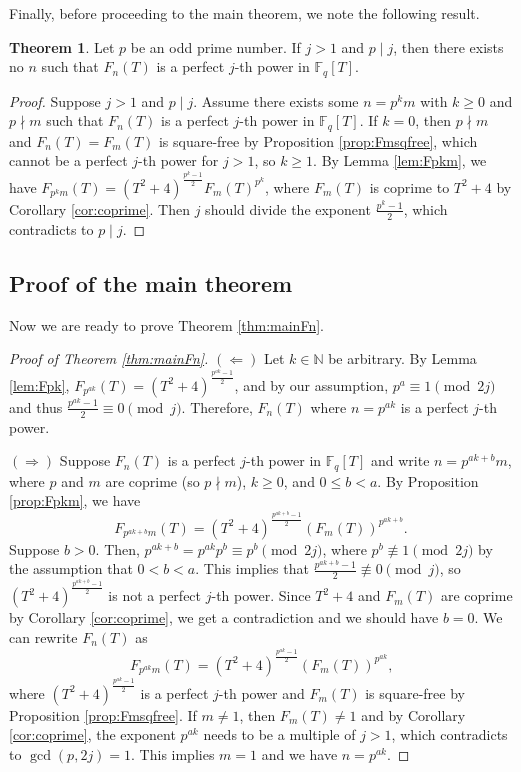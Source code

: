 \documentclass[letterpaper, 10pt]{article}
\newcommand{\1}{\mathds{1}}	%
\theoremstyle{definition}
\newtheorem{theorem}{Theorem}[section]
\theoremstyle{remark}
\begin{document}
Finally, before proceeding to the main theorem, we note the following result.

\begin{theorem}
    \label{thm:Fnnonpower}
    Let $p$ be an odd prime number. If $j > 1$ and $p \mid j$, then there exists no $n$ such that $F_n(T)$ is a perfect $j$-th power in $\mathbb{F}_q[T]$.
\end{theorem}

\begin{proof}
    Suppose $j > 1$ and $p \mid j$. Assume there exists some $n = p^km$ with $k \geq 0$ and $p \nmid m$ such that $F_n(T)$ is a perfect $j$-th power in $\mathbb{F}_q[T]$. 
    If $k = 0$, then $p \nmid m$ and $F_n(T) = F_m(T)$ is square-free by Proposition \ref{prop:Fmsqfree}, which cannot be a perfect $j$-th power for $j > 1$, so $k \ge 1$.
    By Lemma \ref{lem:Fpkm}, we have $F_{p^k m}(T) = (T^2 + 4)^{\frac{p^k - 1}{2}} F_m(T)^{p^k}$, where $F_m(T)$ is coprime to $T^2 + 4$ by Corollary \ref{cor:coprime}.
    Then $j$ should divide the exponent $\frac{p^k - 1}{2}$, which contradicts to $p \mid j$.
\end{proof}

\subsection{Proof of the main theorem}

Now we are ready to prove Theorem \ref{thm:mainFn}.

\begin{proof}[Proof of Theorem \ref{thm:mainFn}]
    $(\Leftarrow)$ Let $k \in \mathbb{N}$ be arbitrary. By Lemma \ref{lem:Fpk}, $F_{p^{ak}}(T) = (T^2 +4)^{\frac{p^{ak} - 1}{2}}$, and by our assumption, $p^a \equiv 1 \pmod {2j}$ and thus $\frac{p^{ak} - 1}{2} \equiv 0 \pmod j$. Therefore, $F_n(T)$ where $n = p^{ak}$ is a perfect $j$-th power.
    
    $(\Rightarrow)$ Suppose $F_n(T)$ is a perfect $j$-th power in $\mathbb{F}_q[T]$ and write $n = p^{ak + b}m$, where $p$ and $m$ are coprime (so $p \nmid m$), $k \geq 0$, and \(0 \le b < a\). By Proposition \ref{prop:Fpkm}, we have
    \[
        F_{p^{ak + b}m}(T) = (T^2 + 4)^\frac{p^{ak + b} - 1}{2} \left(F_m(T)\right)^{p^{ak + b}} \text{.}
    \]
    Suppose $b > 0$. Then, $p^{ak + b} = p^{ak}p^b \equiv p^b \pmod{2j}$, where $p^b \not \equiv 1 \pmod{2j}$ by the assumption that $0 < b < a$. This implies that $\frac{p^{ak + b} - 1}{2} \not \equiv 0 \pmod j$, so $(T^2 + 4)^\frac{p^{ak + b} - 1}{2}$ is not a perfect $j$-th power.
    Since \(T^2 + 4\) and \(F_m(T)\) are coprime by Corollary \ref{cor:coprime}, we get a contradiction and we should have \(b = 0\).
    We can rewrite \(F_n(T)\) as
    \[
        F_{p^{ak}m}(T) = (T^2 + 4)^\frac{p^{ak} - 1}{2} \left(F_m(T)\right)^{p^{ak}} \text{,}
    \]
    where \((T^2 + 4)^{\frac{p^{ak} - 1}{2}}\) is a perfect \(j\)-th power and \(F_m(T)\) is square-free by Proposition \ref{prop:Fmsqfree}. If \(m \ne 1\), then \(F_m(T) \ne 1\) and by Corollary \ref{cor:coprime}, the exponent \(p^{ak}\) needs to be a multiple of \(j > 1\), which contradicts to \( \gcd(p, 2j) = 1\).
    This implies \(m = 1\) and we have \(n = p^{ak}\).
\end{proof}
\end{document}
